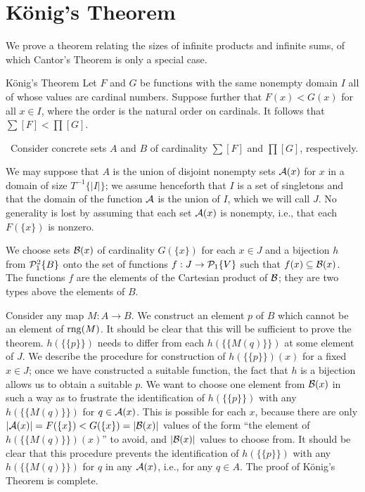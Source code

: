 \section{K\"onig's Theorem}

We prove a theorem relating the sizes of infinite
products and infinite sums, of which Cantor's
Theorem is only a special case.

\begin{Thm}{K\"onig's Theorem}
 Let $F$ and $G$ be functions with the same
 nonempty domain $I$ all of whose values are
 cardinal numbers.  Suppose further that $F(x) < G(x)$
 for all $x\in I$, where the order is the natural order on cardinals.  It
 follows that $\sum[F] < \prod[G]$.
\end{Thm}

\preuve\ Consider concrete sets $A$ and $B$ of cardinality
$\sum[F]$ and $\prod[G]$, respectively.

We may suppose that $A$ is the union of disjoint nonempty sets
${\cal A}(x)$ for $x$ in a domain of size $T^{-1}\{|I|\}$; we
assume henceforth 
that $I$ is a set of singletons and that the domain of the
function ${\cal A}$ is the union of $I$, which we will call $J$.  No generality
is lost by assuming that each set ${\cal A}(x)$ is nonempty, i.e.,
that each $F(\{x\})$ is nonzero.

We choose sets ${\cal B}(x)$ of cardinality $G(\{x\})$
for each $x \in J$ and a bijection $h$ from ${\cal P}_1^2\{B\}$
onto the set of functions $f:J \rightarrow {\cal P}_1\{V\}$
such that $f(x) \subseteq {\cal B}(x)$.  The functions $f$ are the elements of
the Cartesian
product of ${\cal B}$; they are two types above the elements of $B$.

Consider any map $M:A \rightarrow B$.  We construct an element $p$ of
$B$ which cannot be an element of $\mathop{\mathrm{rng}}(M)$.  It should be clear that
this will be sufficient to prove the theorem.  $h(\{\{p\}\})$ needs to
differ from each $h(\{\{M(q)\}\})$ at some element of $J$.  We
describe the procedure for construction of $h(\{\{p\}\})(x)$ for a
fixed $x \in J$; once we have constructed a suitable function, the
fact that $h$ is a bijection allows us to obtain a suitable $p$.  We
want to choose one element from ${\cal B}(x)$ in such a way as to
frustrate the identification of $h(\{\{p\}\})$ with any
$h(\{\{M(q)\}\})$ for $q \in {\cal A}(x)$.  This is possible for each
$x$, because there are only $|{\cal A}(x)|= F(\{x\}) <G(\{x\})=|{\cal
B}(x)|$ values of the form ``the element of $h(\{\{M(q)\}\})(x)$'' to
avoid, and $|{\cal B}(x)|$ values to choose from.  It should be clear
that this procedure prevents the identification of $h(\{\{p\}\})$ with
any $h(\{\{M(q)\}\})$ for $q$ in any ${\cal A}(x)$, i.e., for any $q
\in A$.  The proof of K\"onig's Theorem is complete.
\finpreuve

